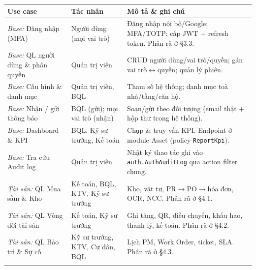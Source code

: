 
{\small\singlespacing\renewcommand{\arraystretch}{1.2}
\begin{longtable}{|>{\raggedright\arraybackslash}p{3.5cm}|>{\raggedright\arraybackslash}p{2.9cm}|>{\raggedright\arraybackslash}p{7.6cm}|}
\hline
\textbf{Use case} & \textbf{Tác nhân} & \textbf{Mô tả \& ghi chú} \\ \hline
\endhead
\textit{Base:} Đăng nhập (MFA) & Người dùng (mọi vai trò) & Đăng nhập nội bộ/Google; MFA/TOTP; cấp JWT + refresh token. Phân rã ở §3.3. \\ \hline
\textit{Base:} QL người dùng \& phân quyền & Quản trị viên & CRUD người dùng/vai trò/quyền; gán vai trò$\leftrightarrow$quyền; quản lý phiên. \\ \hline
\textit{Base:} Cấu hình \& danh mục & Quản trị viên, BQL & Tham số hệ thống; danh mục toà nhà/tầng/căn hộ. \\ \hline
\textit{Base:} Nhận / gửi thông báo & BQL (gửi); mọi vai trò (nhận) & Soạn/gửi theo đối tượng (email thật + hộp thư trong hệ thống). \\ \hline
\textit{Base:} Dashboard \& KPI & BQL, Kỹ sư trưởng, Kế toán & Chụp \& truy vấn KPI. Endpoint ở module Asset (policy \texttt{ReportKpi}). \\ \hline
\textit{Base:} Tra cứu Audit log & Quản trị viên & Nhật ký thao tác ghi vào \texttt{auth.AuthAuditLog} qua action filter chung. \\ \hline
\textit{Tài sản:} QL Mua sắm \& Kho & Kế toán, BQL, KTV, Kỹ sư trưởng & Kho, vật tư, PR$\rightarrow$PO$\rightarrow$hóa đơn, OCR, NCC. Phân rã ở §4.1. \\ \hline
\textit{Tài sản:} QL Vòng đời tài sản & Kế toán, Kỹ sư trưởng & Ghi tăng, QR, điều chuyển, khấu hao, thanh lý, kế toán. Phân rã ở §4.2. \\ \hline
\textit{Tài sản:} QL Bảo trì \& Sự cố & Kỹ sư trưởng, KTV, Cư dân, BQL & Lịch PM, Work Order, ticket, SLA. Phân rã ở §4.3. \\ \hline
\multicolumn{3}{r}{\footnotesize\textit{Bảng 3.2. Phân tích use case tổng quát}}
\end{longtable}}


